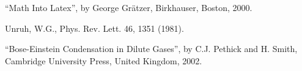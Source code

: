 
\begin{thebibliography}{99}  %

 ``Math Into Latex'', by George Gr\"{a}tzer, Birkhauser, Boston, 2000.

 Unruh, W.G., Phys. Rev. Lett. 46, 1351 (1981).

 ``Bose-Einstein Condensation in Dilute Gases'', by C.J. Pethick and H. Smith, Cambridge University Press, United Kingdom, 2002.

\end{thebibliography}
